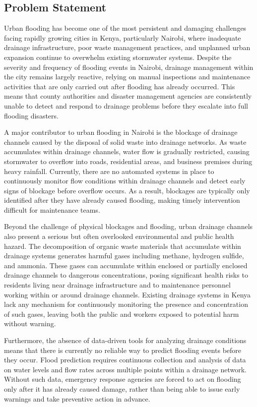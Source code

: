 \documentclass[12pt, a4paper]{article}
\begin{document}
\subsection{Problem Statement}

Urban flooding has become one of the most persistent and damaging challenges facing rapidly growing cities in Kenya, particularly Nairobi, where inadequate drainage infrastructure, poor waste management practices, and unplanned urban expansion continue to overwhelm existing stormwater systems. Despite the severity and frequency of flooding events in Nairobi, drainage management within the city remains largely reactive, relying on manual inspections and maintenance activities that are only carried out after flooding has already occurred. This means that county authorities and disaster management agencies are consistently unable to detect and respond to drainage problems before they escalate into full flooding disasters.

A major contributor to urban flooding in Nairobi is the blockage of drainage channels caused by the disposal of solid waste into drainage networks. As waste accumulates within drainage channels, water flow is gradually restricted, causing stormwater to overflow into roads, residential areas, and business premises during heavy rainfall. Currently, there are no automated systems in place to continuously monitor flow conditions within drainage channels and detect early signs of blockage before overflow occurs. As a result, blockages are typically only identified after they have already caused flooding, making timely intervention difficult for maintenance teams.

Beyond the challenge of physical blockages and flooding, urban drainage channels also present a serious but often overlooked environmental and public health hazard. The decomposition of organic waste materials that accumulate within drainage systems generates harmful gases including methane, hydrogen sulfide, and ammonia. These gases can accumulate within enclosed or partially enclosed drainage channels to dangerous concentrations, posing significant health risks to residents living near drainage infrastructure and to maintenance personnel working within or around drainage channels. Existing drainage systems in Kenya lack any mechanism for continuously monitoring the presence and concentration of such gases, leaving both the public and workers exposed to potential harm without warning.

Furthermore, the absence of data-driven tools for analyzing drainage conditions means that there is currently no reliable way to predict flooding events before they occur. Flood prediction requires continuous collection and analysis of data on water levels and flow rates across multiple points within a drainage network. Without such data, emergency response agencies are forced to act on flooding only after it has already caused damage, rather than being able to issue early warnings and take preventive action in advance.
\end{document}
